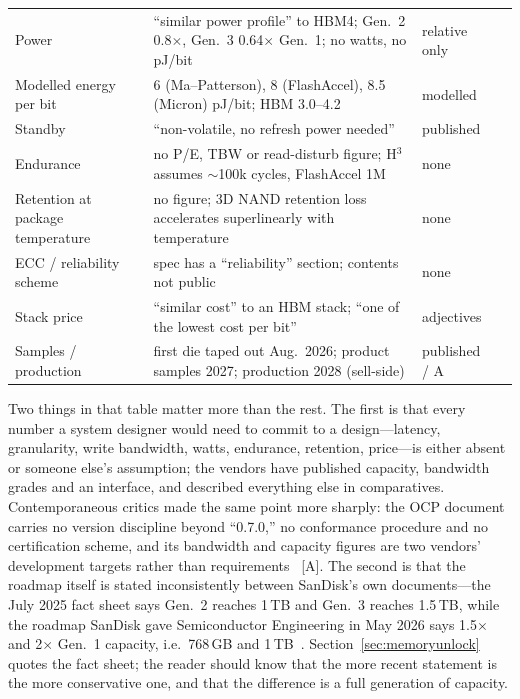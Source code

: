 \begin{table}[htbp]
\begin{tabular}{p{36mm}p{56mm}p{20mm}p{30mm}}
    Power & ``similar power profile'' to HBM4; Gen.\ 2 0.8$\times$, Gen.\ 3 0.64$\times$ Gen.\ 1; no watts, no pJ/bit & relative only & \cite{sandisk-hbf-facts} \\
    Modelled energy per bit & 6 (Ma--Patterson), 8 (FlashAccel), 8.5 (Micron) pJ/bit; HBM 3.0--4.2 & modelled & \cite{hbf-ma-patterson,hbf-flashaccel,hbf-micron-hotinfra,ssd-energy} \\
    Standby & ``non-volatile, no refresh power needed'' & published & \cite{sandisk-hbf-facts} \\
    Endurance & no P/E, TBW or read-disturb figure; H$^3$ assumes $\sim$100k cycles, FlashAccel 1M & none & \cite{hbf-h3,hbf-flashaccel} \\
    Retention at package temperature & no figure; 3D NAND retention loss accelerates superlinearly with temperature & none & \cite{hbf-heatwatch} \\
    ECC / reliability scheme & spec has a ``reliability'' section; contents not public & none & \cite{hbf-ocp} \\
    Stack price & ``similar cost'' to an HBM stack; ``one of the lowest cost per bit'' & adjectives & \cite{sandisk-hbf-facts,hbf-toms-2025} \\
    Samples / production & first die taped out Aug.\ 2026; product samples 2027; production 2028 (sell-side) & published / A & \cite{hbf-investorday,hbf-tapeout} \\
    \bottomrule
  \end{tabular}
\end{table}

Two things in that table matter more than the rest. The first is that every number a system designer would need to commit to a design---latency, granularity, write bandwidth, watts, endurance, retention, price---is either absent or someone else's assumption; the vendors have published capacity, bandwidth grades and an interface, and described everything else in comparatives. Contemporaneous critics made the same point more sharply: the OCP document carries no version discipline beyond ``0.7.0,'' no conformance procedure and no certification scheme, and its bandwidth and capacity figures are two vendors' development targets rather than requirements~\cite{hbf-critique} [A]. The second is that the roadmap itself is stated inconsistently between SanDisk's own documents---the July 2025 fact sheet says Gen.\ 2 reaches 1\,TB and Gen.\ 3 reaches 1.5\,TB, while the roadmap SanDisk gave Semiconductor Engineering in May 2026 says 1.5$\times$ and 2$\times$ Gen.\ 1 capacity, i.e.\ 768\,GB and 1\,TB~\cite{sandisk-hbf-facts,hbf-semieng}. Section~\ref{sec:memoryunlock} quotes the fact sheet; the reader should know that the more recent statement is the more conservative one, and that the difference is a full generation of capacity.

